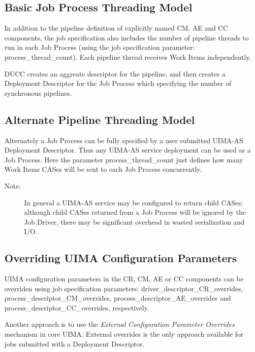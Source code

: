    \subsection{Basic Job Process Threading Model}
   In addition to the pipeline definition of explicitly named CM, AE and CC components, the job
   specification also includes the number of pipeline threads to run in each
   Job Process (using the job specification parameter: process\_thread\_count).
   Each pipeline thread receives Work Items independently.

   DUCC creates an aggreate descriptor for the pipeline, and then creates a
   Deployment Descriptor for the Job Process which specifying the number
   of synchronous pipelines.
   
   \subsection{Alternate Pipeline Threading Model}
   Alternately a Job Process can be fully specified by a user submitted UIMA-AS
   Deployment Descriptor. Thus any UIMA-AS service deployment can be used as a
   Job Process. Here the parameter process\_thread\_count just defines
   how many Work Items CASes will be sent to each Job Process concurrently.
   
	\begin{description}
	    \item[Note:] In general a UIMA-AS service may be configured to
	    return child CASes; although child CASes returned from a Job Process will be
	    ignored by the Job Driver, there may be significant overhead in wasted
	    serialization and I/O.
	\end{description}

   \subsection{Overriding UIMA Configuration Parameters}
   UIMA configuration parameters in the CR, CM, AE or CC components can be overriden using
   job specification parameters: driver\_descriptor\_CR\_overrides, process\_descriptor\_CM\_overrides,
   process\_descriptor\_AE\_overrides and process\_descriptor\_CC\_overrides, respectively.

   Another approach is to use the {\em External Configuration Parameter Overrides} mechanism
   in core UIMA. External overrides is the only approach available for jobs submitted with
   a Deployment Descriptor.


